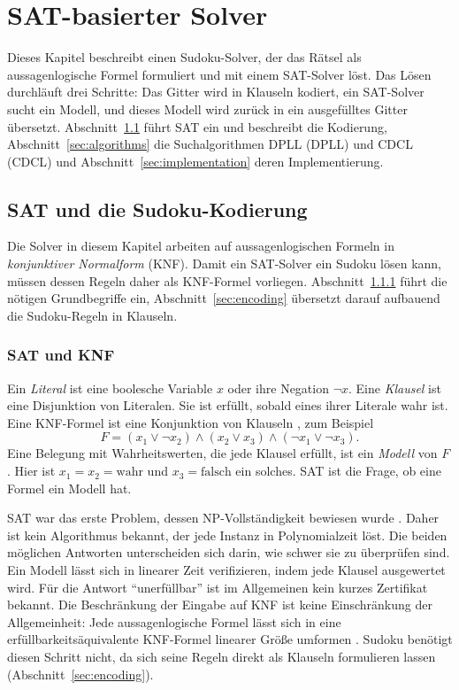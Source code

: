 \section{SAT-basierter Solver} \label{sec:sat}

Dieses Kapitel beschreibt einen Sudoku-Solver, der das Rätsel als aussagenlogische Formel formuliert und mit einem \acs{SAT}-Solver löst.
Das Lösen durchläuft drei Schritte: Das Gitter wird in Klauseln kodiert, ein \acs{SAT}-Solver sucht ein Modell, und dieses Modell wird zurück in ein ausgefülltes Gitter übersetzt.
Abschnitt~\ref{sec:sat-encoding} führt \acs{SAT} ein und beschreibt die Kodierung, Abschnitt~\ref{sec:algorithms} die Suchalgorithmen \acl{DPLL} (\acs{DPLL}) und \acl{CDCL} (\acs{CDCL}) und Abschnitt~\ref{sec:implementation} deren Implementierung.

\subsection{SAT und die Sudoku-Kodierung} \label{sec:sat-encoding}

Die Solver in diesem Kapitel arbeiten auf aussagenlogischen Formeln in \emph{konjunktiver Normalform} (\acs{KNF}).
Damit ein \acs{SAT}-Solver ein Sudoku lösen kann, müssen dessen Regeln daher als \acs{KNF}-Formel vorliegen.
Abschnitt~\ref{sec:sat-cnf} führt die nötigen Grundbegriffe ein, Abschnitt~\ref{sec:encoding} übersetzt darauf aufbauend die Sudoku-Regeln in Klauseln.

\subsubsection{SAT und KNF} \label{sec:sat-cnf}

Ein \emph{Literal} ist eine boolesche Variable $x$ oder ihre Negation $\neg x$.
Eine \emph{Klausel} ist eine Disjunktion von Literalen. Sie ist erfüllt, sobald eines ihrer Literale wahr ist.
Eine \acs{KNF}-Formel ist eine Konjunktion von Klauseln , zum Beispiel
\[
    F = (x_1 \lor \neg x_2) \land (x_2 \lor x_3) \land (\neg x_1 \lor \neg x_3).
\]
Eine Belegung mit Wahrheitswerten, die jede Klausel erfüllt, ist ein \emph{Modell} von $F$.
Hier ist $x_1 = x_2 = \text{wahr}$ und $x_3 = \text{falsch}$ ein solches.
\acs{SAT} ist die Frage, ob eine Formel ein Modell hat.

\acs{SAT} war das erste Problem, dessen NP-Vollständigkeit bewiesen wurde . Daher ist kein Algorithmus bekannt, der jede Instanz in Polynomialzeit löst.
Die beiden möglichen Antworten unterscheiden sich darin, wie schwer sie zu überprüfen sind.
Ein Modell lässt sich in linearer Zeit verifizieren, indem jede Klausel ausgewertet wird.
Für die Antwort \enquote{unerfüllbar} ist im Allgemeinen kein kurzes Zertifikat bekannt.
Die Beschränkung der Eingabe auf \acs{KNF} ist keine Einschränkung der Allgemeinheit: Jede aussagenlogische Formel lässt sich in eine erfüllbarkeitsäquivalente \acs{KNF}-Formel linearer Größe umformen .
Sudoku benötigt diesen Schritt nicht, da sich seine Regeln direkt als Klauseln formulieren lassen (Abschnitt~\ref{sec:encoding}).

